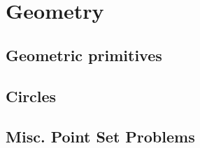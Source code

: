 \chapter{Geometry}

\section{Geometric primitives}

\section{Circles}


\section{Misc. Point Set Problems}

